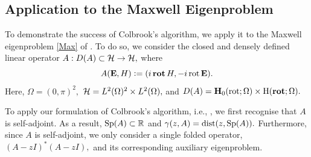 



\subsection{Application to the Maxwell Eigenproblem} \label{Matt Max}

To demonstrate the success of Colbrook's algorithm, we apply it to the Maxwell eigenproblem \eqref{Max} of . To do so, we consider the closed and densely defined linear operator $A: D(A) \subset \mathcal{H} \rightarrow \mathcal{H},$ where
\begin{equation} \label{max op}
    A(\mathbf{E}, H) \vcentcolon= (i \operatorname{\mathbf{rot}} H, - i \operatorname{rot} \mathbf{E}).
\end{equation}
Here, $\Omega = (0, \pi)^2,$ $\mathcal{H} = L^2(\Omega)^2 \times L^2(\Omega),$ and $D(A) = \mathbf{H}_0(\operatorname{rot} ; \Omega) \times \text{H}(\operatorname{\mathbf{rot}};\Omega).$


To apply our formulation of Colbrook's algorithm, i.e., , we first recognise that $A$ is self-adjoint. As a result, $\operatorname{Sp}\!\left(A\right) \subset \mathbb{R}$ and $\gamma(z, A) = \operatorname{dist}(z, \operatorname{Sp}\!\left(A\right)).$ Furthermore, since $A$ is self-adjoint, we only consider a single folded operator, $(A-zI)^*(A-zI),$ and its corresponding auxiliary eigenproblem.

